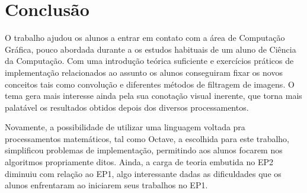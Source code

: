 \documentclass[brazil,times]{abnt}
\begin{document}
\chapter{Conclusão}
	O trabalho ajudou os alunos a entrar em contato com a área de Computação Gráfica, pouco abordada durante a os estudos habituais de um aluno de Ciência da Computação. Com uma introdução teórica suficiente e exercícios práticos de implementação relacionados ao assunto os alunos conseguiram fixar os novos conceitos tais como convolução e diferentes métodos de filtragem de imagens. O tema gera mais interesse ainda pela sua conotação visual inerente, que torna mais palatável os resultados obtidos depois dos diversos processamentos.
	
	Novamente, a possibilidade de utilizar uma linguagem voltada pra processamentos matemáticos, tal como Octave, a escolhida para este trabalho, simplificou problemas de implementação, permitindo aos alunos focarem nos algoritmos propriamente ditos. Ainda, a carga de teoria embutida no EP2 diminuiu com relação ao EP1, algo interessante dadas as dificuldades que os alunos enfrentaram ao iniciarem seus trabalhos no EP1.
	
\nocite{*}


\end{document}
